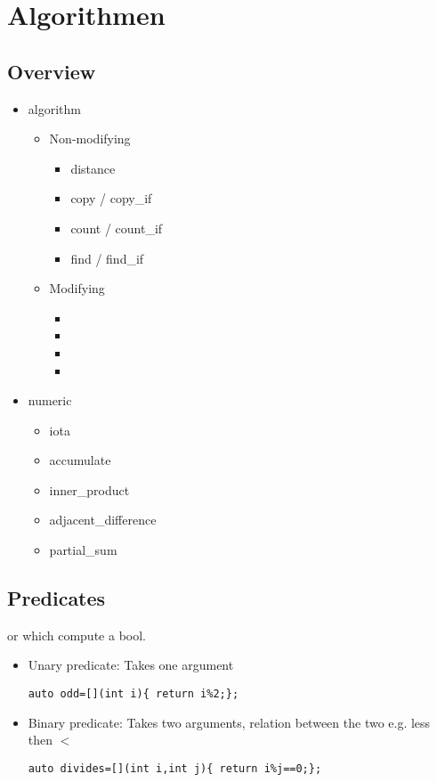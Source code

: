 \section{Algorithmen}
\label{Algorithmen}
\subsection{Overview}
\begin{itemize}
	\item algorithm
		\begin{itemize}
			\item Non-modifying
				\begin{itemize}
					\item distance
					\item copy / copy\_if
					\item count / count\_if
					\item \label{find} find / find\_if
				\end{itemize}
			\item Modifying
				\begin{itemize}
					\item 
					\item
					\item
					\item
				\end{itemize}
		\end{itemize}
	\item numeric
		\begin{itemize}
			\item iota
			\item accumulate
			\item inner\_product
			\item adjacent\_difference
			\item partial\_sum
		\end{itemize}
\end{itemize}

\subsection{Predicates}
 or  which compute a bool.
\begin{itemize}
\item Unary predicate: 
Takes one argument
\begin{lstlisting}
auto odd=[](int i){ return i%2;};
\end{lstlisting}
\item Binary predicate:
Takes two arguments, relation between the two e.g. less then $<$
\begin{lstlisting}
auto divides=[](int i,int j){ return i%j==0;};
\end{lstlisting}
\end{itemize}